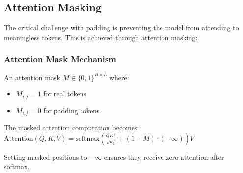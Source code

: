 \subsection{Attention Masking}

The critical challenge with padding is preventing the model from attending to meaningless \pad{} tokens. This is achieved through attention masking:

\subsubsection{Attention Mask Mechanism}
An attention mask $M \in \{0, 1\}^{B \times L}$ where:
\begin{itemize}
\item $M_{i,j} = 1$ for real tokens
\item $M_{i,j} = 0$ for padding tokens
\end{itemize}

The masked attention computation becomes:\\
$\text{Attention}(Q, K, V) = \text{softmax}\left(\frac{QK^T}{\sqrt{d_k}} + (1-M) \cdot (-\infty)\right)V$

Setting masked positions to $-\infty$ ensures they receive zero attention after softmax.

